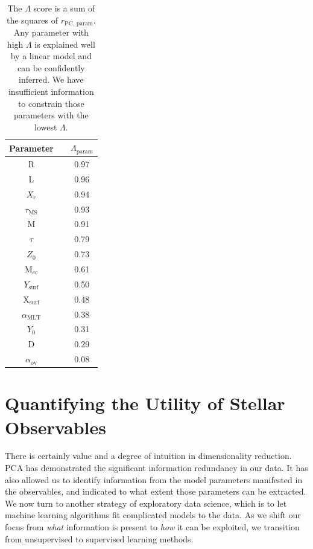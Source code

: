 \begin{table}
    \centering
    \begin{tabular}{ccc}
    \hline \hline
   
Parameter &  & $\Lambda_{\text{param}}$ \\ \hline     
R	&	&	0.97	\\
L	&	&	0.96	\\
$X_c$	&	&	0.94	\\
$\tau_{\text{MS}}$	&	&	0.93	\\
M	&	&	0.91	\\
$\tau$	&	&	0.79	\\
$Z_0$	&	&	0.73	\\
M$_{cc}$	&	&	0.61	\\
$Y_{\text{surf}}$	&	&	0.50	\\
X$_{\text{surf}}$	&	&	0.48	\\
$\alpha_{\text{MLT}}$	&	&	0.38	\\
$Y_0$	&	&	0.31	\\
D	&	&	0.29	\\
$\alpha_{\text{ov}}$	&	&	0.08	\\
 \hline
    \end{tabular}
    \caption{The $\Lambda$ score is a sum of the squares of  $r_{\text{PC, param}}$. Any parameter with high $\Lambda$ is explained well by a linear model and can be confidently inferred. We have insufficient information to constrain those parameters with the lowest $\Lambda$.}
    \label{tab:corrL}
\end{table}



\section{Quantifying the Utility of Stellar Observables} 
\label{sec:qu}

There is certainly value and a degree of intuition in dimensionality reduction.
PCA has demonstrated the significant information redundancy in our data. 
It has also allowed us to identify information from the model parameters manifested in the observables, and indicated to what extent those parameters can be extracted.  
We now turn to another strategy of exploratory data science, which is to let machine learning algorithms fit complicated models to the data. As we shift our focus from \emph{what} information is present to \emph{how} it can be exploited, we transition from unsupervised to supervised learning methods. 


